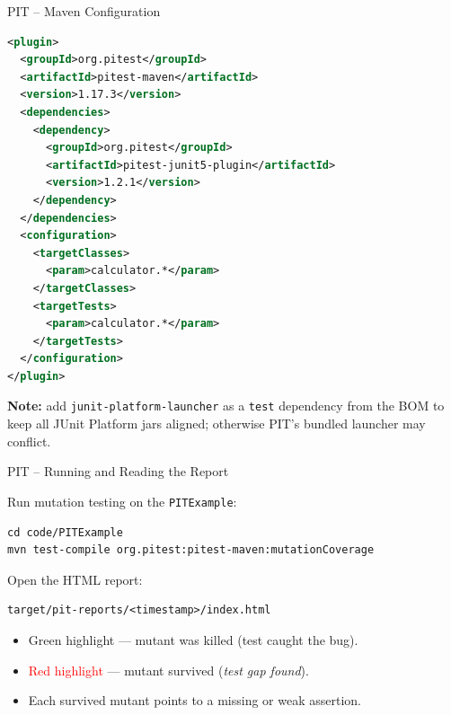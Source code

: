 \documentclass[11pt, xcolor=svgnames]{beamer}
\begin{document}

\begin{frame}[fragile]{PIT -- Maven Configuration}

\begin{lstlisting}[language=XML,basicstyle=\tiny]
<plugin>
  <groupId>org.pitest</groupId>
  <artifactId>pitest-maven</artifactId>
  <version>1.17.3</version>
  <dependencies>
    <dependency>
      <groupId>org.pitest</groupId>
      <artifactId>pitest-junit5-plugin</artifactId>
      <version>1.2.1</version>
    </dependency>
  </dependencies>
  <configuration>
    <targetClasses>
      <param>calculator.*</param>
    </targetClasses>
    <targetTests>
      <param>calculator.*</param>
    </targetTests>
  </configuration>
</plugin>
\end{lstlisting}

\textbf{Note:} add \texttt{junit-platform-launcher} as a \texttt{test} dependency from the BOM to keep all JUnit Platform jars aligned; otherwise PIT's bundled launcher may conflict.

\end{frame}


\begin{frame}[fragile]{PIT -- Running and Reading the Report}

Run mutation testing on the \texttt{PITExample}:

\begin{lstlisting}[language={}]
cd code/PITExample
mvn test-compile org.pitest:pitest-maven:mutationCoverage
\end{lstlisting}

Open the HTML report:

\begin{lstlisting}[language={}]
target/pit-reports/<timestamp>/index.html
\end{lstlisting}

\begin{itemize}
  \item \textcolor{green!60!black}{Green highlight} --- mutant was killed (test caught the bug).
  \item \textcolor{red}{Red highlight} --- mutant survived (\emph{test gap found}).
  \item Each survived mutant points to a missing or weak assertion.
\end{itemize}

\end{frame}
\end{document}

